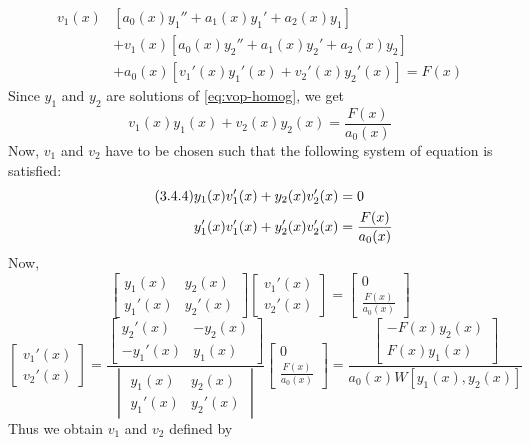 \begin{equation*}
    \begin{split}
        v_1(x)  &[a_0(x)y_1'' + a_1(x)y_1' + a_2(x)y_1]\\
                & + v_1(x)[a_0(x)y_2'' + a_1(x)y_2' + a_2(x)y_2]\\
                & + a_0(x)[ v_1'(x)y_1'(x) + v_2'(x)y_2'(x) ] = F(x)
    \end{split}
\end{equation*}
Since $y_1$ and $y_2$ are solutions of \eqref{eq:vop-homog}, we get \[
     v_1(x)y_1(x) + v_2(x)y_2(x) = \frac{F(x)}{a_0(x)}
\]
Now, $v_1$ and $v_2$ have to be chosen such that the following system of equation is satisfied:
\begin{align}
    \label{eq:vop-system}
    \tag{3.4.4}
    y_1(x)v_1'(x) + y_2(x)v_2'(x) &= 0 \\
    y_1'(x)v_1'(x) + y_2'(x)v_2'(x) &= \frac{F(x)}{a_0(x)} \notag
\end{align}
Now,
\[
    \begin{bmatrix}
        y_1(x) & y_2(x) \\
        y_1'(x) & y_2'(x)
    \end{bmatrix}
    \begin{bmatrix}
        v_1'(x) \\
        v_2'(x)
    \end{bmatrix} = 
    \begin{bmatrix}
        0 \\
        \frac{F(x)}{a_0(x)}
    \end{bmatrix} 
\] \[
    \begin{bmatrix}
        v_1'(x) \\
        v_2'(x)
    \end{bmatrix} = 
    \frac{
        \begin{bmatrix}
            y_2'(x) & -y_2(x) \\
            -y_1'(x) & y_1(x)
        \end{bmatrix}
    }{
        \begin{vmatrix}
            y_1(x) & y_2(x) \\
            y_1'(x) & y_2'(x)
        \end{vmatrix}
    }
    \begin{bmatrix}
        0 \\
        \frac{F(x)}{a_0(x)}
    \end{bmatrix} = 
    \frac{
        \begin{bmatrix}
            - F(x)y_2(x) \\
            F(x)y_1(x)
        \end{bmatrix}
    }{
        a_0(x)W[ y_1(x), y_2(x) ]
    }
\] Thus we obtain $v_1$ and $v_2$ defined by
